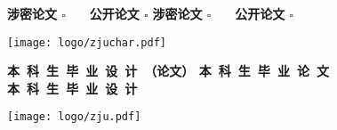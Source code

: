 \thispagestyle{empty}
\setcounter{page}{-1}

\begin{flushright}
  {\bfseries 涉密论文 $\square$ ~~ 公开论文 $\square$ }
  {\bfseries 涉密论文 $\square$ ~~ 公开论文 $\square$ }
\end{flushright}

\vskip 10mm

\begin{center}
    \texttt{[image: logo/zjuchar.pdf]}
\end{center}

\begin{center}
     \heiti \bfseries
    {
      本~科~生~毕~业~设~计~（论文）
    }
    {
      {
          本~科~生~毕~业~论~文
      }
      {
          本~科~生~毕~业~设~计
      }
    }
\end{center}

\vskip 20pt

\begin{center}
    \texttt{[image: logo/zju.pdf]}
\end{center}

\vskip 20pt

{
    \newcommand{\CoverTitle}{
        题目      &  \uline{\hfill \Title{} \hfill} \\
        ~ & ~\\
    }
}
{
    \newcommand{\CoverTitle}{
        题目      &  \uline{\hfill \TitleLineOne{} \hfill} \\
        ~        & \uline{\hfill \TitleLineTwo{} \hfill} \\
    }
}

